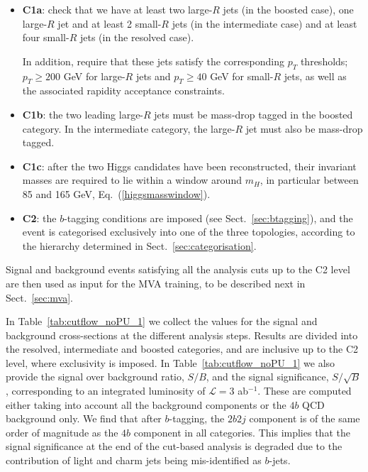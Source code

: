 \begin{itemize}
    \item {\bf C1a}:  check that we have at least
      two large-$R$ jets (in the boosted case),
      one large-$R$ jet and at least 2 small-$R$ jets (in the intermediate
      case) and at least four small-$R$ jets (in the resolved case).

      In addition,
  require that these jets 
      satisfy the corresponding $p_T$ thresholds;
      $p_T \ge 200$ GeV for large-$R$ jets and
      $p_T \ge 40$ GeV for small-$R$ jets, as well as
      the associated
      rapidity acceptance constraints.
    \item {\bf C1b}: the two leading large-$R$ jets must
      be mass-drop tagged in the boosted category.
      In the intermediate category, the large-$R$ jet
      must also be mass-drop tagged.
    \item {\bf C1c}: after the two Higgs candidates  have been reconstructed,
      their invariant masses are required to lie within a window around $m_H$,
      in particular between 85 and 165 GeV, Eq.~(\ref{higgsmasswindow}).
          \item {\bf C2}: the
            $b$-tagging conditions are
            imposed (see
            Sect.~\ref{sec:btagging}), and the event is categorised exclusively
            into one of the three topologies, according
            to the hierarchy determined in Sect.~\ref{sec:categorisation}.
      \end{itemize}
    Signal and background events satisfying all the analysis cuts up to the
    C2 level
    are then used as input for the MVA training, to be described next
    in Sect.~\ref{sec:mva}.
    
    In Table~\ref{tab:cutflow_noPU_1} we collect
    the values for the signal and background cross-sections
    at the different analysis steps.
    Results are divided into the resolved, intermediate and boosted categories,
    and are inclusive up to the C2 level, where exclusivity is imposed.
In Table~\ref{tab:cutflow_noPU_1} we also  provide the signal over
      background ratio, $S/B$, and the signal
      significance, $S/\sqrt{B}$, corresponding to an integrated
      luminosity of $\mathcal{L}=3$ ab$^{-1}$.
      These are computed either
      taking into account all the background components or
      the $4b$ QCD background only.
      We find that after $b$-tagging, the  $2b2j$ component is
      of the same order of magnitude as the $4b$ component in all categories.
      This implies that the signal significance at the end of the cut-based
      analysis is degraded due to the contribution
      of light and charm jets being mis-identified as $b$-jets.
    
